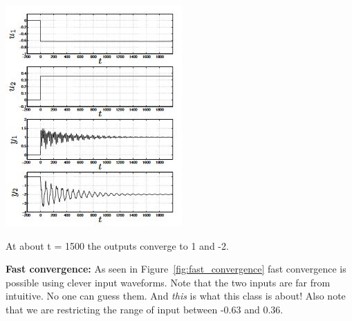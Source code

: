 \documentclass{../tufte-handout}
\begin{document}
\begin{marginfigure}
  \includegraphics[width=\linewidth]{simple_approach}
  \caption{At about t = 1500 the outputs converge to 1 and -2.}
  \label{fig:simple_approach}
\end{marginfigure}

\newpage
\textbf{Fast convergence: } As seen in Figure~\ref{fig:fast_convergence} fast convergence is possible using clever input waveforms. Note that the two inputs are far from intuitive. No one can guess them. And \textit{this} is what this class is about! Also note that we are restricting the range of input between -0.63 and 0.36.
\end{document}

